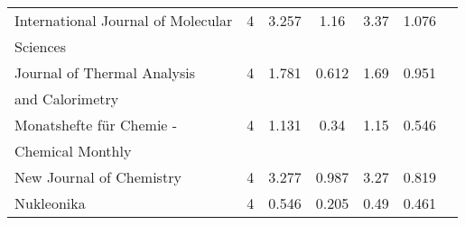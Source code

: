 \begin{longtable}[c]{lcccrcc}
  International Journal of Molecular                                                 & 4      & 3.257   & 1.16  &  3.37      & 1.076                 \\[0.5ex]
  Sciences                                                                           &        &         &       &            &                       \\[0.5ex]
  Journal of Thermal Analysis                                                        & 4      & 1.781   & 0.612 &  1.69      & 0.951                 \\[0.5ex]
  and Calorimetry                                                                    &        &         &       &            &                       \\[0.5ex]
  Monatshefte für Chemie -                                                           & 4      & 1.131   & 0.34  &  1.15      & 0.546                 \\[0.5ex]
  Chemical Monthly                                                                   &        &         &       &            &                       \\[0.5ex]
  New Journal of Chemistry                                                           & 4      & 3.277   & 0.987 &  3.27      & 0.819                 \\[0.5ex]
  Nukleonika                                                                         & 4      & 0.546   & 0.205 &  0.49      & 0.461                 \\[0.5ex]
\end{longtable}

